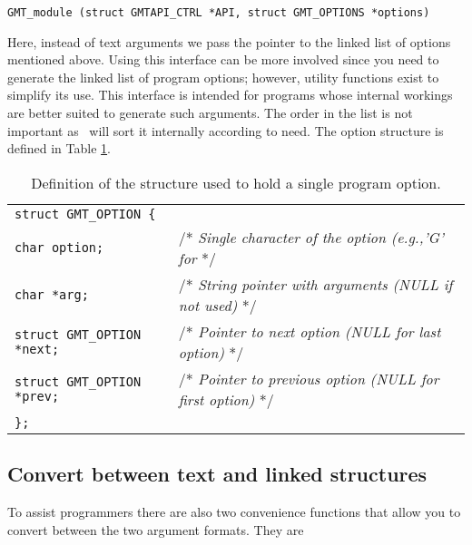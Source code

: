 \documentclass{report}
\begin{document}
\begin{verbatim}
GMT_module (struct GMTAPI_CTRL *API, struct GMT_OPTIONS *options)
\end{verbatim}
Here, instead of text arguments we pass the pointer to the linked list of options mentioned above.  Using
this interface can be more involved since you need to generate the linked
list of program options; however, utility functions exist to simplify its use.
This interface is intended for programs whose internal workings are better suited to
generate such arguments.  The order in the list is not important as \GMT\ will sort it internally
according to need.  The option structure is defined in Table \ref{tbl:options}.
\begin{table}[h]
\small
\centering
\begin{tabular}{ll} \hline
\multicolumn{2}{l}{\texttt{struct GMT\_OPTION \{}} \\ 
\texttt{char option;}			&       /* {\it Single character of the option (e.g.,'G' for} \Opt{G} */ \\
\texttt{char *arg;}			&       /* {\it String pointer with arguments (NULL if not used)} */ \\
\texttt{struct GMT\_OPTION *next;}	&       /* {\it Pointer to next option (NULL for last option)}  */\\
\texttt{struct GMT\_OPTION *prev;}	&       /* {\it Pointer to previous option (NULL for first option)}  */\\
\texttt{\};}	&        \\  \hline
\end{tabular}
\caption{Definition of the structure used to hold a single program option.}
\label{tbl:options}
\end{table}

\subsection{Convert between text and linked structures}

To assist programmers there are also two convenience functions that
allow you to convert between the two argument formats.  They are
\end{document}
